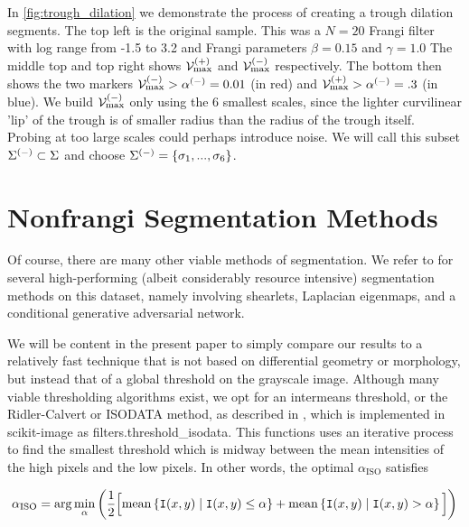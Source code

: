 In \cref{fig:trough_dilation} we demonstrate the process of creating a trough dilation segments. The top left is the original sample. This was a $N=20$ Frangi filter with log range from -1.5 to 3.2 and Frangi parameters $\beta=0.15$ and $\gamma=1.0$ The middle top and top right shows $\mathcal{V}_{\max}^{(+)}$ and $\mathcal{V}_{\max}^{(-)}$ respectively. The bottom then shows the two markers 
 $\mathcal{V}_{\max}^{(-)} > \alpha^{(-)} = 0.01$ (in red) and
 $\mathcal{V}_{\max}^{(+)} > \alpha^{(-)} = .3$ (in blue). We build $\mathcal{V}_{\max}^{(-)}$ only using the 6 smallest scales, since the lighter curvilinear 'lip' of the trough is of smaller radius than the radius of the trough itself. Probing at too large scales could perhaps introduce noise. We will call this subset $\Sigma^{(-)} \subset \Sigma $ and choose $\Sigma^{(-)}=\{\sigma_1 , ... , \sigma_6\}$.
 
 

\section{Nonfrangi Segmentation Methods}

Of course, there are many other viable methods of segmentation. We refer to \autocite{anghel2018placental} for several high-performing (albeit considerably resource intensive) segmentation methods on this dataset, namely involving shearlets, Laplacian eigenmaps, and a conditional generative adversarial network.

We will be content in the present paper to simply compare our results to a relatively fast technique that is not based on differential geometry or morphology, but instead that of a global threshold on the grayscale image. Although many viable thresholding algorithms exist, we opt for an intermeans threshold, or the Ridler-Calvert or ISODATA method, as described in \autocite{isodata}, which is implemented in \textrm{scikit-image} as \textrm{filters.threshold\_isodata}. This functions uses an iterative process to find the smallest threshold which is midway between the mean intensities of the high pixels and the low pixels. In other words, the optimal $\alpha_{\textrm{ISO}}$ satisfies

\begin{equation} \label{eq:ISODATA}
\alpha_{\textrm{ISO}} = \arg\min_{\alpha} \left( \frac{1}{2} \Big[
\textrm{mean}\left\{ \mathtt{I}(x,y) \;|\; \mathtt{I}(x,y) \le \alpha \right\} 
+
\textrm{mean}\left\{ \mathtt{I}(x,y) \;|\; \mathtt{I}(x,y) >   \alpha \right\}
 \Big]
 \right)
\end{equation}

